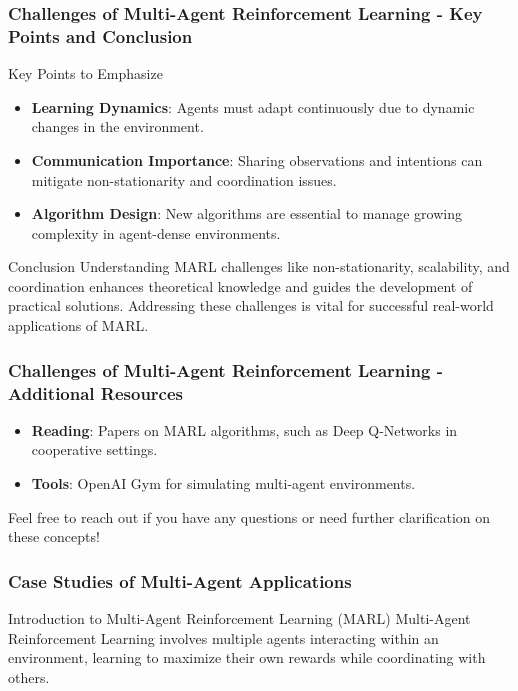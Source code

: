\documentclass[aspectratio=169]{beamer}
\begin{document}
\begin{frame}[fragile]
    \frametitle{Challenges of Multi-Agent Reinforcement Learning - Key Points and Conclusion}
    \begin{block}{Key Points to Emphasize}
        \begin{itemize}
            \item \textbf{Learning Dynamics}: Agents must adapt continuously due to dynamic changes in the environment.
            \item \textbf{Communication Importance}: Sharing observations and intentions can mitigate non-stationarity and coordination issues.
            \item \textbf{Algorithm Design}: New algorithms are essential to manage growing complexity in agent-dense environments.
        \end{itemize}
    \end{block}

    \begin{block}{Conclusion}
        Understanding MARL challenges like non-stationarity, scalability, and coordination enhances theoretical knowledge and guides the development of practical solutions. Addressing these challenges is vital for successful real-world applications of MARL.
    \end{block}
\end{frame}

\begin{frame}[fragile]
    \frametitle{Challenges of Multi-Agent Reinforcement Learning - Additional Resources}
    \begin{itemize}
        \item \textbf{Reading}: Papers on MARL algorithms, such as Deep Q-Networks in cooperative settings.
        \item \textbf{Tools}: OpenAI Gym for simulating multi-agent environments.
    \end{itemize}

    \centering
    Feel free to reach out if you have any questions or need further clarification on these concepts!
\end{frame}

\begin{frame}[fragile]
    \frametitle{Case Studies of Multi-Agent Applications}
    \begin{block}{Introduction to Multi-Agent Reinforcement Learning (MARL)}
        Multi-Agent Reinforcement Learning involves multiple agents interacting within an environment, learning to maximize their own rewards while coordinating with others.
    \end{block}
\end{frame}
\end{document}
